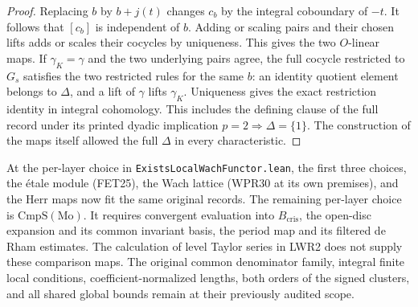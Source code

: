\begin{proof}
Replacing $b$ by $b+j(t)$ changes $c_b$ by the integral coboundary
of $-t$. It follows that $[c_b]$ is independent of $b$. Adding or
scaling pairs and their chosen lifts adds or scales their cocycles
by uniqueness. This gives the two $O$-linear maps. If
$\gamma_K=\gamma$ and the two underlying pairs agree, the full
cocycle restricted to $G_s$ satisfies the two restricted rules
for the same $b$: an identity quotient element belongs to $\Delta$,
and a lift of $\gamma$ lifts $\gamma_K$. Uniqueness gives the exact
restriction identity in integral cohomology. This includes the
defining clause of the full record under its printed dyadic
implication $p=2\Rightarrow\Delta=\{1\}$. The construction of the
maps itself allowed the full $\Delta$ in every characteristic.
\end{proof}

At the per-layer choice in \texttt{ExistsLocalWachFunctor.lean},
the first three choices, the \'etale module (FET25), the Wach lattice
(WPR30 at its own premises), and the Herr maps now fit the same
original records. The remaining per-layer choice is
$\mathrm{CmpS}(\mathrm{Mo})$. It requires convergent evaluation into
$B_{\mathrm{cris}}$, the open-disc expansion and its common invariant
basis, the period map and its filtered de Rham estimates. The
calculation of level Taylor series in LWR2 does not supply these
comparison maps. The original common denominator family, integral
finite local conditions, coefficient-normalized lengths, both
orders of the signed clusters, and all shared global bounds remain
at their previously audited scope.

